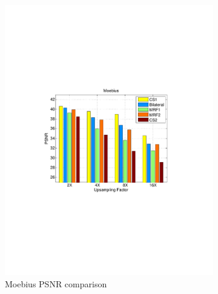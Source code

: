 \documentclass[preprint,10pt,5p,times,twocolumn]{elsarticle}
\begin{document}
\begin{figure}
\begin{subfigure}[b]{0.24\textwidth}
\includegraphics[width=\textwidth]{fig_exp1_moebius_noise.pdf}
\caption*{Moebius PSNR comparison}
\end{subfigure}
\begin{subfigure}[b]{0.24\textwidth}

\end{subfigure}
\end{figure}
\end{document}
